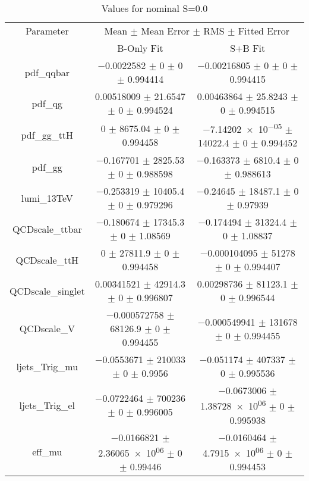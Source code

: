 \begin{table}
\centering
\caption{Values for nominal S=0.0}
\begin{tabular}{ccc}
\toprule
Parameter & \multicolumn{2}{c}{Mean $\pm$ Mean Error $\pm$ RMS $\pm$ Fitted Error}\\
 & B-Only Fit & S+B Fit\\
\midrule
pdf\_qqbar & \num{-0.0022582} $\pm$ \num{0} $\pm$ \num{0} $\pm$ \num{0.994414} & \num{-0.00216805} $\pm$ \num{0} $\pm$ \num{0} $\pm$ \num{0.994415}\\
pdf\_qg & \num{0.00518009} $\pm$ \num{21.6547} $\pm$ \num{0} $\pm$ \num{0.994524} & \num{0.00463864} $\pm$ \num{25.8243} $\pm$ \num{0} $\pm$ \num{0.994515}\\
pdf\_gg\_ttH & \num{0} $\pm$ \num{8675.04} $\pm$ \num{0} $\pm$ \num{0.994458} & \num{-7.14202e-05} $\pm$ \num{14022.4} $\pm$ \num{0} $\pm$ \num{0.994452}\\
pdf\_gg & \num{-0.167701} $\pm$ \num{2825.53} $\pm$ \num{0} $\pm$ \num{0.988598} & \num{-0.163373} $\pm$ \num{6810.4} $\pm$ \num{0} $\pm$ \num{0.988613}\\
lumi\_13TeV & \num{-0.253319} $\pm$ \num{10405.4} $\pm$ \num{0} $\pm$ \num{0.979296} & \num{-0.24645} $\pm$ \num{18487.1} $\pm$ \num{0} $\pm$ \num{0.97939}\\
QCDscale\_ttbar & \num{-0.180674} $\pm$ \num{17345.3} $\pm$ \num{0} $\pm$ \num{1.08569} & \num{-0.174494} $\pm$ \num{31324.4} $\pm$ \num{0} $\pm$ \num{1.08837}\\
QCDscale\_ttH & \num{0} $\pm$ \num{27811.9} $\pm$ \num{0} $\pm$ \num{0.994458} & \num{-0.000104095} $\pm$ \num{51278} $\pm$ \num{0} $\pm$ \num{0.994407}\\
QCDscale\_singlet & \num{0.00341521} $\pm$ \num{42914.3} $\pm$ \num{0} $\pm$ \num{0.996807} & \num{0.00298736} $\pm$ \num{81123.1} $\pm$ \num{0} $\pm$ \num{0.996544}\\
QCDscale\_V & \num{-0.000572758} $\pm$ \num{68126.9} $\pm$ \num{0} $\pm$ \num{0.994455} & \num{-0.000549941} $\pm$ \num{131678} $\pm$ \num{0} $\pm$ \num{0.994455}\\
ljets\_Trig\_mu & \num{-0.0553671} $\pm$ \num{210033} $\pm$ \num{0} $\pm$ \num{0.9956} & \num{-0.051174} $\pm$ \num{407337} $\pm$ \num{0} $\pm$ \num{0.995536}\\
ljets\_Trig\_el & \num{-0.0722464} $\pm$ \num{700236} $\pm$ \num{0} $\pm$ \num{0.996005} & \num{-0.0673006} $\pm$ \num{1.38728e+06} $\pm$ \num{0} $\pm$ \num{0.995938}\\
eff\_mu & \num{-0.0166821} $\pm$ \num{2.36065e+06} $\pm$ \num{0} $\pm$ \num{0.99446} & \num{-0.0160464} $\pm$ \num{4.7915e+06} $\pm$ \num{0} $\pm$ \num{0.994453}\\

\end{tabular}
\end{table}
